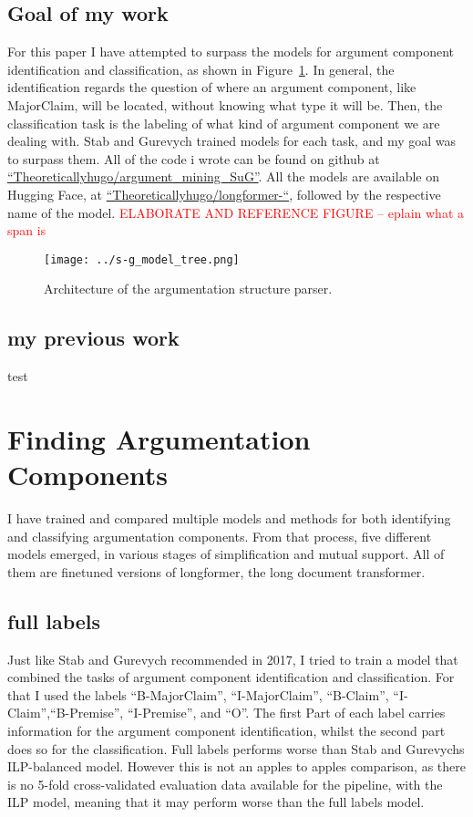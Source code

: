 \documentclass[12]{article}
\theoremstyle{mytheoremstyle}
\theoremstyle{mytheoremstyle}
\theoremstyle{myproblemstyle}
\begin{document}
  \subsection{Goal of my work}
  For this paper I have attempted to surpass the models for argument component identification and classification, as shown in Figure~\ref{fig:model_tree}. In general, the identification regards the question of where an argument component, like MajorClaim, will be located, without knowing what type it will be. Then, the classification task is the labeling of what kind of argument component we are dealing with. Stab and Gurevych trained models for each task, and my goal was to surpass them. All of the code i wrote can be found on github at \href{https://github.com/Theoreticallyhugo/argument_mining_SuG}{``Theoreticallyhugo/argument\_mining\_SuG''}. All the models are available on Hugging Face, at \href{https://huggingface.co/Theoreticallyhugo}{``Theoreticallyhugo/longformer-``}, followed by the respective name of the model. \textcolor{red}{ELABORATE AND REFERENCE FIGURE -- eplain what a span is} 
  \begin{figure}[!h]
    \centering
    \texttt{[image: ../s-g\_model\_tree.png]}
    \caption{Architecture of the argumentation structure parser.}
    \label{fig:model_tree}
  \end{figure}
  \subsection{my previous work}
  test
  \section{Finding Argumentation Components}
  I have trained and compared multiple models and methods for both identifying and classifying argumentation components. From that process, five different models emerged, in various stages of simplification and mutual support. All of them are finetuned versions of longformer\cite{beltagy2020longformer}, the long document transformer. 
  \subsection{full labels} \label{full labels}
  Just like Stab and Gurevych recommended in 2017, I tried to train a model that combined the tasks of argument component identification and classification. For that I used the labels ``B-MajorClaim'', ``I-MajorClaim'', ``B-Claim'', ``I-Claim'',``B-Premise'', ``I-Premise'', and ``O''. The first Part of each label carries information for the argument component identification, whilst the second part does so for the classification. Full labels performs worse than Stab and Gurevychs ILP-balanced model\cite{stab-gurevych-2017-parsing}. However this is not an apples to apples comparison, as there is no 5-fold cross-validated evaluation data available for the pipeline, with the ILP model, meaning that it may perform worse than the full labels model. 
\end{document}
